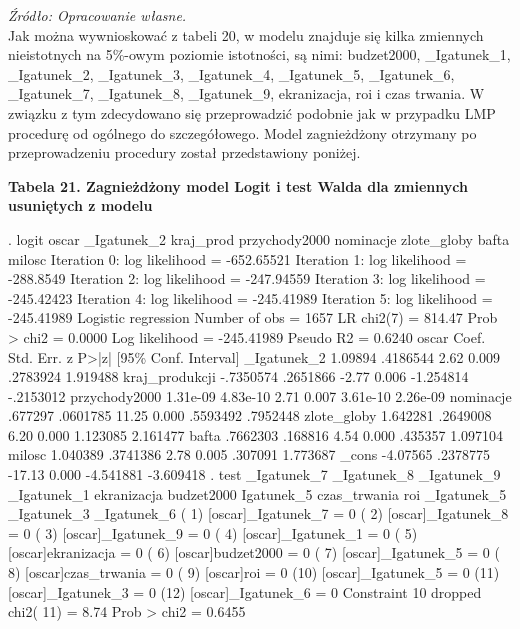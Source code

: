 \textit{\footnotesize{Źródło: Opracowanie własne.}} \\	

Jak można wywnioskować z tabeli 20, w modelu znajduje się kilka zmiennych nieistotnych na 5\%-owym poziomie istotności, są nimi: budzet2000, _Igatunek_1, _Igatunek_2, _Igatunek_3, _Igatunek_4, _Igatunek_5, _Igatunek_6, _Igatunek_7, _Igatunek_8, _Igatunek_9, ekranizacja, roi i czas trwania. W związku z tym zdecydowano się przeprowadzić podobnie jak w przypadku LMP procedurę od ogólnego do szczegółowego. Model zagnieżdżony otrzymany po przeprowadzeniu procedury został przedstawiony poniżej.

\vspace{0.5cm}

\textbf{Tabela 21. Zagnieżdżony model Logit i test Walda dla zmiennych usuniętych z modelu}

\begin{stlog}

. logit oscar _Igatunek_2 kraj_prod przychody2000 nominacje zlote_globy bafta milosc
{\smallskip}
Iteration 0:   log likelihood = -652.65521  
Iteration 1:   log likelihood =  -288.8549  
Iteration 2:   log likelihood = -247.94559  
Iteration 3:   log likelihood = -245.42423  
Iteration 4:   log likelihood = -245.41989  
Iteration 5:   log likelihood = -245.41989  
{\smallskip}
Logistic regression                               Number of obs   =       1657
                                                  LR chi2(7)      =     814.47
                                                  Prob > chi2     =     0.0000
Log likelihood = -245.41989                       Pseudo R2       =     0.6240
{\smallskip}
         oscar {\VBAR}      Coef.   Std. Err.      z    P>|z|     [95\% Conf. Interval]
   _Igatunek_2 {\VBAR}    1.09894   .4186544     2.62   0.009     .2783924    1.919488
kraj_produkcji {\VBAR}  -.7350574   .2651866    -2.77   0.006    -1.254814   -.2153012
 przychody2000 {\VBAR}   1.31e-09   4.83e-10     2.71   0.007     3.61e-10    2.26e-09
     nominacje {\VBAR}    .677297   .0601785    11.25   0.000     .5593492    .7952448
   zlote_globy {\VBAR}   1.642281   .2649008     6.20   0.000     1.123085    2.161477
         bafta {\VBAR}   .7662303    .168816     4.54   0.000      .435357    1.097104
        milosc {\VBAR}   1.040389   .3741386     2.78   0.005      .307091    1.773687
         _cons {\VBAR}   -4.07565   .2378775   -17.13   0.000    -4.541881   -3.609418
{\smallskip}
. test _Igatunek_7 _Igatunek_8 _Igatunek_9 _Igatunek_1 ekranizacja budzet2000 Igatunek_5 czas_trwania 
roi _Igatunek_5 _Igatunek_3 _Igatunek_6
{\smallskip}
 ( 1)  [oscar]_Igatunek_7 = 0
 ( 2)  [oscar]_Igatunek_8 = 0
 ( 3)  [oscar]_Igatunek_9 = 0
 ( 4)  [oscar]_Igatunek_1 = 0
 ( 5)  [oscar]ekranizacja = 0
 ( 6)  [oscar]budzet2000 = 0
 ( 7)  [oscar]_Igatunek_5 = 0
 ( 8)  [oscar]czas_trwania = 0
 ( 9)  [oscar]roi = 0
 (10)  [oscar]_Igatunek_5 = 0
 (11)  [oscar]_Igatunek_3 = 0
 (12)  [oscar]_Igatunek_6 = 0
       Constraint 10 dropped
{\smallskip}
           chi2( 11) =    8.74
         Prob > chi2 =    0.6455

\end{stlog}

